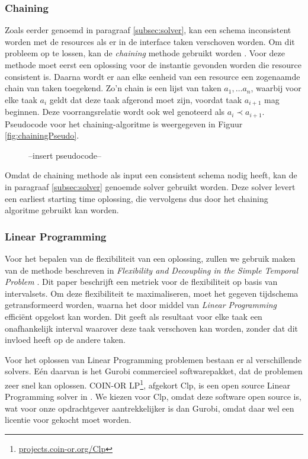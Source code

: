\subsubsection*{Chaining}
Zoals eerder genoemd in paragraaf \ref{subsec:solver}, kan een schema inconsistent worden met de resources als er in de interface taken verschoven worden. Om dit probleem op te lossen, kan de \emph{chaining} methode gebruikt worden \cite{policella2007precedence}. Voor deze methode moet eerst een oplossing voor de instantie gevonden worden die resource consistent is. Daarna wordt er aan elke eenheid van een resource een zogenaamde chain van taken toegekend. Zo'n chain is een lijst van taken $a_1, \dots a_n$, waarbij voor elke taak $a_i$ geldt dat deze taak afgerond moet zijn, voordat taak $a_{i+1}$ mag beginnen. Deze voorrangsrelatie wordt ook wel genoteerd als $a_i \prec a_{i+1}$. Pseudocode voor het chaining-algoritme is weergegeven in Figuur \ref{fig:chainingPseudo}.

\begin{figure}
--insert pseudocode--
\end{figure}

Omdat de chaining methode als input een consistent schema nodig heeft, kan de in paragraaf \ref{subsec:solver} genoemde solver gebruikt worden. Deze solver levert een earliest starting time oplossing, die vervolgens dus door het chaining algoritme gebruikt kan worden.


\subsubsection*{Linear Programming}
Voor het bepalen van de flexibiliteit van een oplossing, zullen we gebruik maken van de methode beschreven in \emph{Flexibility and Decoupling in the Simple Temporal Problem} \cite{wilson2013flexibility}. Dit paper beschrijft een metriek voor de flexibiliteit op basis van intervalsets. Om deze flexibiliteit te maximaliseren, moet het gegeven tijdschema getransformeerd worden, waarna het door middel van \emph{Linear Programming} effici\"ent opgelost kan worden. Dit geeft als resultaat voor elke taak een onafhankelijk interval waarover deze taak verschoven kan worden, zonder dat dit invloed heeft op de andere taken.

Voor het oplossen van Linear Programming problemen bestaan er al verschillende solvers. E\'en daarvan is het Gurobi commercieel softwarepakket, dat de problemen zeer snel kan oplossen. COIN-OR LP\footnote{\href{http://projects.coin-or.org/Clp}{projects.coin-or.org/Clp}}, afgekort Clp, is een open source Linear Programming solver in \cpp . We kiezen voor Clp, omdat deze software open source is, wat voor onze opdrachtgever aantrekkelijker is dan Gurobi, omdat daar wel een licentie voor gekocht moet worden.

